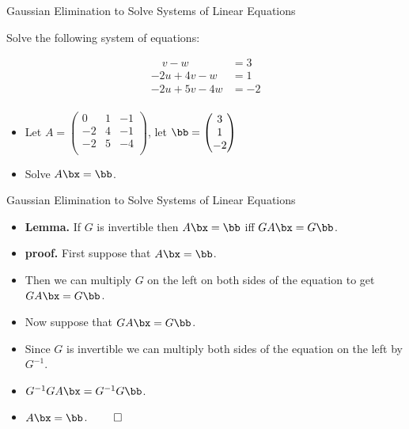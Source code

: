 \documentclass{beamer}
\begin{document}

\begin{frame}{Gaussian Elimination to Solve Systems of Linear Equations}

Solve the following system of equations:

\pause

\begin{align*}
 \quad v - w         &= 3 \\
-2u + 4v - w         &= 1 \\
-2u + 5v - 4w        &= -2 \\
\end{align*}

\pause

\begin{itemize}
\item Let $A=
\begin{pmatrix}
 0 & 1 & -1 \\
-2 & 4 & -1 \\
-2 & 5 & -4 \\
\end{pmatrix}
$,
let
$
\bb =
\begin{pmatrix}
3 \\ 1 \\ -2
\end{pmatrix}
$
\item Solve $A\bx=\bb$.
\end{itemize}
\end{frame}


\begin{frame}{Gaussian Elimination to Solve Systems of Linear Equations}

\begin{itemize}
\item \textbf{Lemma.} If $G$ is invertible then $A\bx=\bb$ iff $GA\bx=G\bb$.
\item \textbf{proof.} First suppose that $A\bx=\bb$.
\item Then we can multiply $G$ on the left on both sides of the equation
to get $GA\bx=G\bb$.
\item Now suppose that $GA\bx=G\bb$.
\item Since $G$ is invertible we can multiply both sides of the equation
on the left by $G^{-1}$.
\item $G^{-1}GA\bx = G^{-1}G\bb$.
\item $A\bx=\bb$. $\qed$
\end{itemize}
\end{frame}
\end{document}

